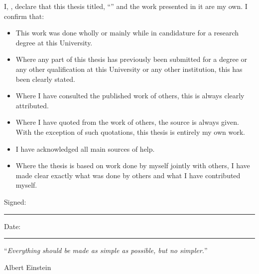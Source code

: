 \documentclass[
11pt, %
english, %
onehalfspacing,
headsepline, %
oneside]{MastersDoctoralThesis} %
\begin{document}
\begin{declaration}
\addchaptertocentry{\authorshipname} %
\noindent I, \authorname, declare that this thesis titled, \enquote{\ttitle} and the work presented in it are my own. I confirm that:

\begin{itemize} 
\item This work was done wholly or mainly while in candidature for a research degree at this University.
\item Where any part of this thesis has previously been submitted for a degree or any other qualification at this University or any other institution, this has been clearly stated.
\item Where I have consulted the published work of others, this is always clearly attributed.
\item Where I have quoted from the work of others, the source is always given. With the exception of such quotations, this thesis is entirely my own work.
\item I have acknowledged all main sources of help.
\item Where the thesis is based on work done by myself jointly with others, I have made clear exactly what was done by others and what I have contributed myself.
\end{itemize}
 
\noindent Signed:\\
\rule[0.5em]{25em}{0.5pt} %
 
\noindent Date:\\
\rule[0.5em]{25em}{0.5pt} %
\end{declaration}

\cleardoublepage


\vspace*{0.2\textheight}

\noindent\enquote{\itshape Everything should be made as simple as possible, but no simpler.}\bigbreak

\hfill Albert Einstein

\end{document}
